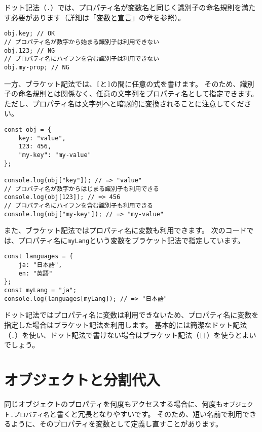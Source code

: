 ドット記法（\texttt{.}）では、プロパティ名が変数名と同じく識別子の命名規則を満たす必要があります（詳細は「\hyperlink{variable-and-declaration}{変数と宣言}」の章を参照）。

\begin{lstlisting}
obj.key; // OK
// プロパティ名が数字から始まる識別子は利用できない
obj.123; // NG
// プロパティ名にハイフンを含む識別子は利用できない
obj.my-prop; // NG
\end{lstlisting}

一方、ブラケット記法では、\texttt{[}と\texttt{]}の間に任意の式を書けます。
そのため、識別子の命名規則とは関係なく、任意の文字列をプロパティ名として指定できます。
ただし、プロパティ名は文字列へと暗黙的に変換されることに注意してください。

\begin{lstlisting}
const obj = {
    key: "value",
    123: 456,
    "my-key": "my-value"
};

console.log(obj["key"]); // => "value"
// プロパティ名が数字からはじまる識別子も利用できる
console.log(obj[123]); // => 456
// プロパティ名にハイフンを含む識別子も利用できる
console.log(obj["my-key"]); // => "my-value"
\end{lstlisting}

また、ブラケット記法ではプロパティ名に変数も利用できます。
次のコードでは、プロパティ名に\texttt{myLang}という変数をブラケット記法で指定しています。

\begin{lstlisting}
const languages = {
    ja: "日本語",
    en: "英語"
};
const myLang = "ja";
console.log(languages[myLang]); // => "日本語"
\end{lstlisting}

ドット記法ではプロパティ名に変数は利用できないため、プロパティ名に変数を指定した場合はブラケット記法を利用します。
基本的には簡潔なドット記法（\texttt{.}）を使い、ドット記法で書けない場合はブラケット記法（\texttt{[]}）を使うとよいでしょう。

\hypertarget{object-destructuring}{%
\section[オブジェクトと分割代入]{オブジェクトと分割代入\,\protect{}}\label{object-destructuring}}

同じオブジェクトのプロパティを何度もアクセスする場合に、何度も\texttt{オブジェクト.\hbox{}プロパティ名}と書くと冗長となりやすいです。
そのため、短い名前で利用できるように、そのプロパティを変数として定義し直すことがあります。

